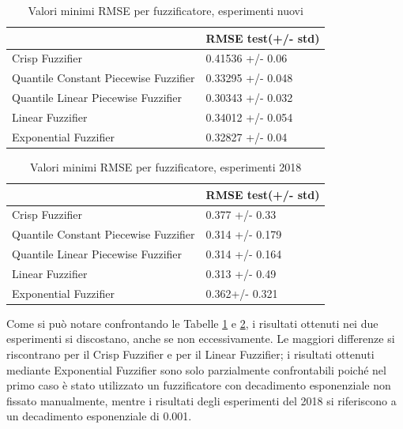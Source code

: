 \documentclass[12pt,a4paper]{report}
\begin{document}
\begin{table}[h!]
\centering 	
	\begin{tabular}{|l|l|} 
	 \hline
	  & RMSE test(+/- std) \\ [0.5ex] 
	 \hline
	 Crisp Fuzzifier & 0.41536 +/- 0.06\\ 
	 \hline
	 Quantile Constant Piecewise Fuzzifier & 0.33295 +/- 0.048\\
	 \hline
	 Quantile Linear Piecewise Fuzzifier & 0.30343 +/- 0.032\\
	 \hline
	 Linear Fuzzifier & 0.34012 +/- 0.054\\
	 \hline
	 Exponential Fuzzifier & 0.32827 +/- 0.04\\ [1ex] 
	 \hline
	\end{tabular}
	\caption{Valori minimi RMSE per fuzzificatore, esperimenti nuovi}
	\label{table: risultatiNuoviEsperimenti}
\end{table}

\begin{table}[h!]
\centering 	
	\begin{tabular}{|l|l|} 
	 \hline
	  & RMSE test(+/- std) \\ [0.5ex] 
	 \hline
	 Crisp Fuzzifier & 0.377 +/- 0.33\\ 
	 \hline
	 Quantile Constant Piecewise Fuzzifier & 0.314 +/- 0.179\\
	 \hline
	 Quantile Linear Piecewise Fuzzifier &  0.314 +/- 0.164\\
	 \hline
	 Linear Fuzzifier &  0.313 +/- 0.49 \\
	 \hline
	 Exponential Fuzzifier & 0.362+/- 0.321\\ [1ex] 
	 \hline
	\end{tabular}
	\caption{Valori minimi RMSE per fuzzificatore, esperimenti 2018}
	\label{table: risultatiVecchiEsperimenti}
\end{table}

Come si può notare confrontando le Tabelle \ref{table: risultatiNuoviEsperimenti} e \ref{table: risultatiVecchiEsperimenti}, i risultati ottenuti nei due esperimenti si discostano, anche se non eccessivamente.
Le maggiori differenze si riscontrano per il Crisp Fuzzifier e per il Linear Fuzzifier; i risultati ottenuti mediante Exponential Fuzzifier sono solo parzialmente confrontabili poiché nel primo caso è stato utilizzato un fuzzificatore con decadimento esponenziale non fissato manualmente, mentre i risultati degli esperimenti del 2018 si riferiscono a un decadimento esponenziale di 0.001.
\end{document}
